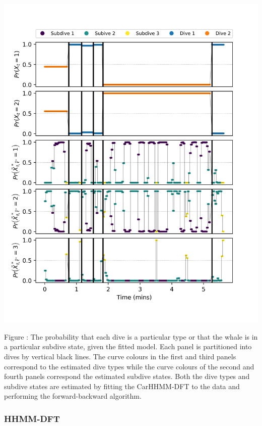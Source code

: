 \documentclass{article}
\begin{document}
        \begin{center}
        \includegraphics[width=6in]{../Plots/CarHHMM2_decoded_states.png}
        \end{center}
        
        \noindent Figure : The probability that each dive is a particular type or that the whale is in a particular subdive state, given the fitted model. Each panel is partitioned into dives by vertical black lines. The curve colours in the first and third panels correspond to the estimated dive types while the curve colours of the second and fourth panels correspond the estimated subdive states. Both the dive types and subdive states are estimated by fitting the CarHHMM-DFT to the data and performing the forward-backward algorithm.
        \addtocounter{fignum}{1}
        
        \subsubsection{HHMM-DFT}
        
\end{document}
